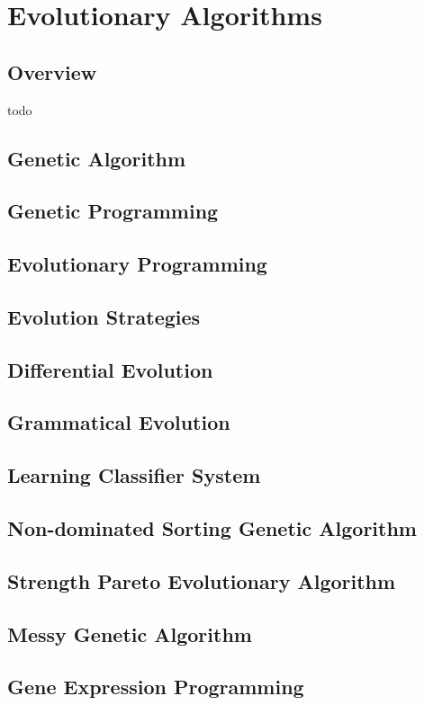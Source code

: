 \chapter{Evolutionary Algorithms}
\label{ch:evolutionary}

\section{Overview}
todo




\section{Genetic Algorithm}
\section{Genetic Programming}
\section{Evolutionary Programming}
\section{Evolution Strategies}
\section{Differential Evolution}
\section{Grammatical Evolution}
\section{Learning Classifier System}
\section{Non-dominated Sorting Genetic Algorithm}
\section{Strength Pareto Evolutionary Algorithm}
\section{Messy Genetic Algorithm}
\section{Gene Expression Programming}
